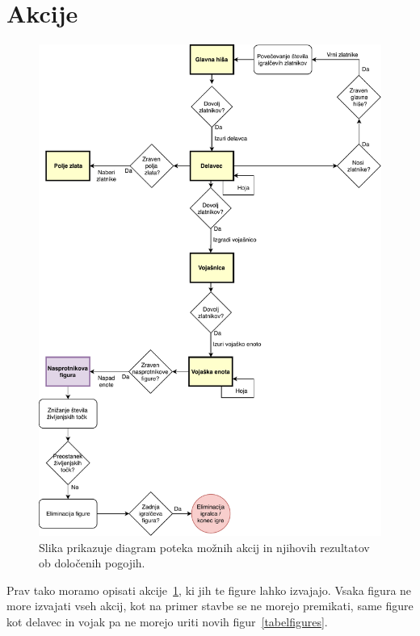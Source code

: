 \documentclass[a4paper, 12pt]{book}
\begin{document}
\section{Akcije}

\begin{figure}[h]
	\begin{center}
		\includegraphics[width=1\textwidth]{photos/prikazAkcij.pdf}
	\end{center}
	\caption{Slika prikazuje diagram poteka možnih akcij in njihovih rezultatov ob določenih pogojih.}
	\label{picActions}
\end{figure}

Prav tako moramo opisati akcije~\ref{picActions}, ki jih te figure lahko izvajajo. 
Vsaka figura ne more izvajati vseh akcij, kot na primer stavbe se ne morejo premikati, same figure kot delavec in vojak pa ne morejo uriti novih figur~\ref{tabelfigures}.
\end{document}
